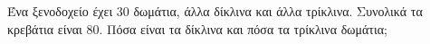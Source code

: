 Ένα ξενοδοχείο έχει 30 δωμάτια, άλλα δίκλινα και άλλα τρίκλινα. Συνολικά τα κρεβάτια είναι 80. Πόσα είναι τα δίκλινα και πόσα τα τρίκλινα δωμάτια;